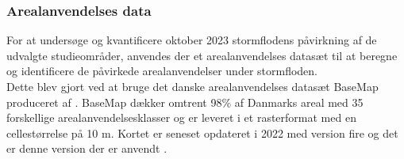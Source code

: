 \subsubsection{Arealanvendelses data} \label{Afsnit: Arealanvendelses data}
For at undersøge og kvantificere oktober 2023 stormflodens påvirkning af de udvalgte studieområder, anvendes der et arealanvendelses datasæt til at beregne og identificere de påvirkede arealanvendelser under stormfloden. \\
Dette blev gjort ved at bruge det danske arealanvendelses datasæt BaseMap produceret af \cite{Jepsen_levin_2013}. BaseMap dækker omtrent 98\% af Danmarks areal med 35 forskellige arealanvendelsesklasser og er leveret i et rasterformat med en cellestørrelse på 10 m. Kortet er seneset opdateret i 2022 med version fire og det er denne version der er anvendt \citep{levin_basemap04_2022}.\\

